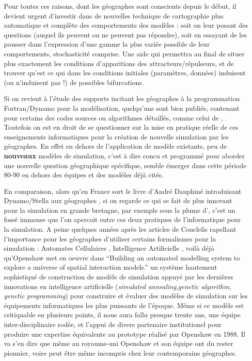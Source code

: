 Pour toutes ces raisons, dont les géographes sont conscients depuis le début, il devient urgent d'investir dans de nouvelles technique de cartographie plus automatique et complète des comportements des modèles : soit on leur posant des questions (auquel ils peuvent ou ne peuvent pas répondre), soit en essayant de les pousser dans l'expression d'une gamme la plus variée possible de leur comportements, stochasticité comprise. Une aide qui permettra au final de situer plus exactement les conditions d'apparitions des attracteurs/répulseurs, et de trouver qu'est ce qui dans les conditions initiales (paramètres, données) induisent (ou n'induisent pas !) de possibles bifurcations.

Si on revient à l'étude des supports incitant les géographes à la programmation Fortran/Dynamo pour la modélisation, quelqu'uns sont bien publiés, contenant pour certains des codes sources ou algorithmes détaillés, comme celui de \textcite{Guermond1984}, \textcite{Dauphine1987}. Toutefois on est en droit de se questionner sur la mise en pratique réelle de ces enseignements informatiques pour la création de nouvelle simulation par les géographes. En effet en dehors de l'application de modèle existants, peu de \textbf{nouveaux} modèles de simulation, c'est à dire concu et programmé pour aborder une nouvelle question géographique spécifique, semble émerger dans cette période 80-90 en dehors des équipes et des modèles déjà cités. 

En comparaison, alors qu'en France sort le livre d'André Dauphiné introduisant Dynamo/Stella aux géographes \autocite{Dauphine1987}, si on regarde ce qui se fait de plus innovant pour la simulation en grande bretagne, par exemple sous la plume d'\textcites{Openshaw1983, Openshaw1988, Openshaw2000}, c'est un fossé immense que l'on apercoit entre ces deux pratiques de l'informatique pour la simulation. A peine quelques années après les articles de Couclelis rapellant l'importance pour les géographes d'utiliser certains formalismes pour la simulation : Automates Cellulaires \autocite{1985}, Intelligence Artificielle \autocite{1986}, voilà déjà qu'Openshaw met en oeuvre dans \enquote{Building an automated modelling system to explore a universe of spatial interaction models.} un système hautement sophistiqué de construction de modèle de simulation appuyé par les dernières innovations en intelligence artificielle (\textit{simulated annealing},\textit{genetic algorithm}, \textit{genetic programming}) pour construire et évaluer des modèles de simulation sur les équipements informatiques les plus puissants de l'époque. Même si ce modèle est critiquable en plusieurs points, il nous aura fallu presque trente ans, une équipe inter-disciplinaire rodée, et l'appui de divers partenaire institutionel pour produire une expertise équivalente au prototype réalisé par Openshaw en 1988. Il va s'en dire que même au royaume-uni Openshaw et son équipe ont du rester pionnier, voire peut être même incompris chez leur contemporains géographes.

